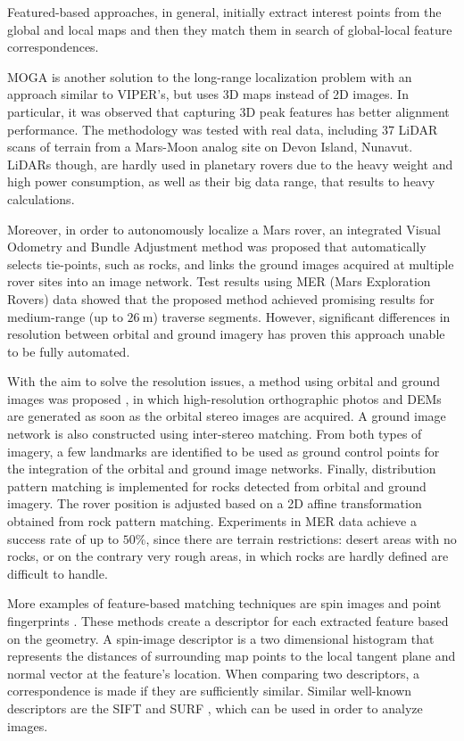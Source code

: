 Featured-based approaches, in general, initially extract interest points
from the global and local maps and then they match them in search of
global-local feature correspondences.

MOGA \parencite{Carle2010} is another solution to the long-range localization
problem with an approach similar to VIPER's, but uses 3D maps
instead of 2D images.
In particular, it was observed that capturing 3D peak features has
better alignment performance.
The methodology was tested with real data, including 37 LiDAR scans of
terrain from a Mars-Moon analog site on Devon Island, Nunavut.
LiDARs though, are hardly used in planetary rovers due to the heavy
weight and high power consumption, as well as their big data range,
that results to heavy calculations.

Moreover, in order to autonomously localize a Mars rover,
an integrated Visual Odometry and Bundle Adjustment method \parencite{Li2007}
was proposed that automatically selects tie-points, such as rocks,
and links the ground images acquired at multiple rover sites into
an image network.
Test results using MER (Mars Exploration Rovers) data showed that the
proposed method achieved promising results for medium-range (up to
$\SI{26}{\m}$) traverse segments.
However, significant differences in resolution between orbital and
ground imagery has proven this approach unable to be fully automated.

With the aim to solve the resolution issues, a method using orbital and
ground images was proposed \parencite{Hwangbo2009}, in which
high-resolution orthographic photos and DEMs are generated as soon as the
orbital stereo images are acquired.
A ground image network is also constructed using inter-stereo matching.
From both types of imagery, a few landmarks are identified to be used as
ground control points for the integration of the orbital and ground
image networks.
Finally, distribution pattern matching is implemented for rocks detected
from orbital and ground imagery.
The rover position is adjusted based on a 2D affine transformation
obtained from rock pattern matching.
Experiments in MER data achieve a success rate of up to $50\%$, since
there are terrain restrictions: desert areas with no rocks,
or on the contrary very rough areas, in which rocks are hardly
defined are difficult to handle.

More examples of feature-based matching techniques are spin images
\parencite{Johnson1997} and point fingerprints \parencite{Sun2003}.
These methods create a descriptor for each extracted feature based on the
geometry.
A spin-image descriptor is a two dimensional histogram that
represents the distances of surrounding map points to the local tangent
plane and normal vector at the feature’s location.
When comparing two descriptors, a correspondence is made if they are
sufficiently similar.
Similar well-known descriptors are the SIFT \parencite{Lowe2004}
and SURF \parencite{Bay2006}, which can be used in order to analyze images.

